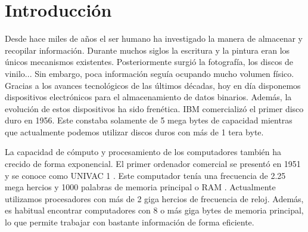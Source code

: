 \documentclass[10pt]{article}
\begin{document}
\makeatletter\renewcommand{\ALG@name}{Algoritmo}

\maketitle



\newpage
\tableofcontents
\newpage


\section{Introducción} \label{sec:introduction}

	Desde hace miles de años el ser humano ha investigado la manera de almacenar y recopilar información. Durante muchos siglos la escritura y la pintura eran los únicos mecanismos existentes. Posteriormente surgió la fotografía, los discos de vinilo... Sin embargo, poca información seguía ocupando mucho volumen físico. Gracias a los avances tecnológicos de las últimos décadas, hoy en día disponemos dispositivos electrónicos para el almacenamiento de datos binarios. Además, la evolución de estos dispositivos ha sido frenética. IBM comercializó el primer disco duro en 1956. Este constaba solamente de 5 mega bytes de capacidad \cite{hard-disks} mientras que actualmente podemos utilizar discos duros con más de 1 tera byte.

	La capacidad de cómputo y procesamiento de los computadores también ha crecido de forma exponencial. El primer ordenador comercial se presentó en 1951 y se conoce como  UNIVAC 1 \cite{first-commercial-computer}. Este computador tenía una frecuencia de 2.25 mega hercios y 1000 palabras de memoria principal o RAM \cite{caract}. Actualmente utilizamos procesadores con más de 2 giga hercios de frecuencia de reloj. Además, es habitual encontrar computadores con 8 o más giga bytes de memoria principal, lo que permite trabajar con bastante información de forma eficiente. 
\end{document}
